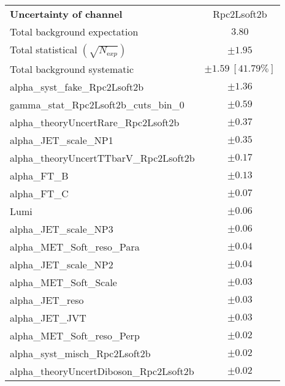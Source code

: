 
\begin{table}
\begin{center}
\setlength{\tabcolsep}{0.0pc}
\begin{tabular*}{\textwidth}{@{\extracolsep{\fill}}lc}
\noalign{\smallskip}\hline\noalign{\smallskip}
{\bfseries Uncertainty of channel}                                    & Rpc2Lsoft2b            \\
\noalign{\smallskip}\hline\noalign{\smallskip}
Total background expectation             &  $3.80$       \\
\noalign{\smallskip}\hline\noalign{\smallskip}
Total statistical $(\sqrt{N_{\mathrm exp}})$              & $\pm 1.95$       \\
Total background systematic               & $\pm 1.59\ [41.79\%] $             \\
\noalign{\smallskip}\hline\noalign{\smallskip}
\noalign{\smallskip}\hline\noalign{\smallskip}
alpha\_syst\_fake\_Rpc2Lsoft2b         & $\pm 1.36$       \\
gamma\_stat\_Rpc2Lsoft2b\_cuts\_bin\_0         & $\pm 0.59$       \\
alpha\_theoryUncertRare\_Rpc2Lsoft2b         & $\pm 0.37$       \\
alpha\_JET\_scale\_NP1         & $\pm 0.35$       \\
alpha\_theoryUncertTTbarV\_Rpc2Lsoft2b         & $\pm 0.17$       \\
alpha\_FT\_B         & $\pm 0.13$       \\
alpha\_FT\_C         & $\pm 0.07$       \\
Lumi         & $\pm 0.06$       \\
alpha\_JET\_scale\_NP3         & $\pm 0.06$       \\
alpha\_MET\_Soft\_reso\_Para         & $\pm 0.04$       \\
alpha\_JET\_scale\_NP2         & $\pm 0.04$       \\
alpha\_MET\_Soft\_Scale         & $\pm 0.03$       \\
alpha\_JET\_reso         & $\pm 0.03$       \\
alpha\_JET\_JVT         & $\pm 0.03$       \\
alpha\_MET\_Soft\_reso\_Perp         & $\pm 0.02$       \\
alpha\_syst\_misch\_Rpc2Lsoft2b         & $\pm 0.02$       \\
alpha\_theoryUncertDiboson\_Rpc2Lsoft2b         & $\pm 0.02$       \\

\end{tabular*}
\end{center}
\end{table}
